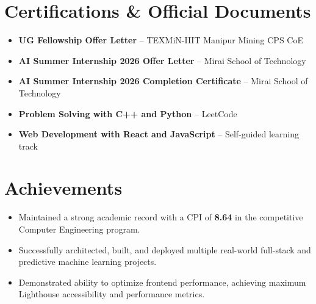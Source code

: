 \documentclass[11pt,a4paper]{article}
\begin{document}
\section{Certifications \& Official Documents}
\vspace{2pt}
\begin{itemize}[leftmargin=0.15in, label={\textbullet}, noitemsep, topsep=0pt]
    \item \small{\textbf{UG Fellowship Offer Letter} -- TEXMiN-IIIT Manipur Mining CPS CoE}
    \item \small{\textbf{AI Summer Internship 2026 Offer Letter} -- Mirai School of Technology}
    \item \small{\textbf{AI Summer Internship 2026 Completion Certificate} -- Mirai School of Technology}
    \item \small{\textbf{Problem Solving with C++ and Python} -- LeetCode}
    \item \small{\textbf{Web Development with React and JavaScript} -- Self-guided learning track}
\end{itemize}
\vspace{-4pt}

\section{Achievements}
\vspace{2pt}
\begin{itemize}[leftmargin=0.15in, label={\textbullet}, noitemsep, topsep=0pt]
    \item \small{Maintained a strong academic record with a CPI of \textbf{8.64} in the competitive Computer Engineering program.}
    \item \small{Successfully architected, built, and deployed multiple real-world full-stack and predictive machine learning projects.}
    \item \small{Demonstrated ability to optimize frontend performance, achieving maximum Lighthouse accessibility and performance metrics.}
\end{itemize}
\end{document}

